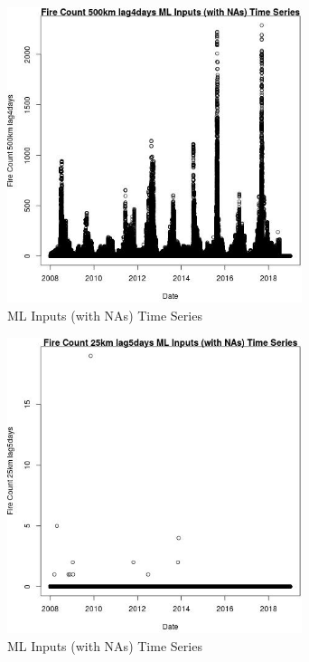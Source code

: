 \begin{figure} 
\centering  
\includegraphics[width=0.77\textwidth]{Code_Outputs/Report_ML_input_PM25_Step4_part_e_de_duplicated_aves_compiled_2019-05-21wNAs_Fire_Count_500km_lag4daysvDate.jpg} 
\caption{\label{fig:Report_ML_input_PM25_Step4_part_e_de_duplicated_aves_compiled_2019-05-21wNAsFire_Count_500km_lag4daysvDate}ML Inputs (with NAs) Time Series} 
\end{figure} 
 

\begin{figure} 
\centering  
\includegraphics[width=0.77\textwidth]{Code_Outputs/Report_ML_input_PM25_Step4_part_e_de_duplicated_aves_compiled_2019-05-21wNAs_Fire_Count_25km_lag5daysvDate.jpg} 
\caption{\label{fig:Report_ML_input_PM25_Step4_part_e_de_duplicated_aves_compiled_2019-05-21wNAsFire_Count_25km_lag5daysvDate}ML Inputs (with NAs) Time Series} 
\end{figure} 
 

